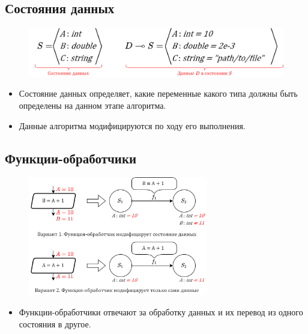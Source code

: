 ﻿%
\subsection{Состояния данных}
\begin{frame}
	\begin{figure}
		\centering
		\includegraphics[width=\textwidth]{images/illustration.datastate.png}
	\end{figure}

	\begin{itemize}
		\item Состояние данных определяет, какие переменные какого типа должны быть определены на данном этапе алгоритма.
		\item Данные алгоритма модифицируются по ходу его выполнения.
	\end{itemize}
\end{frame}

\subsection{Функции-обработчики}
\begin{frame}
	\begin{figure}
		\centering
		\includegraphics[width=0.7\textwidth]{images/illustration.transfer.png}
	\end{figure}

	\begin{itemize}
		\item Функции-обработчики отвечают за обработку данных и их перевод из одного состояния в другое.
	\end{itemize}

\end{frame}


